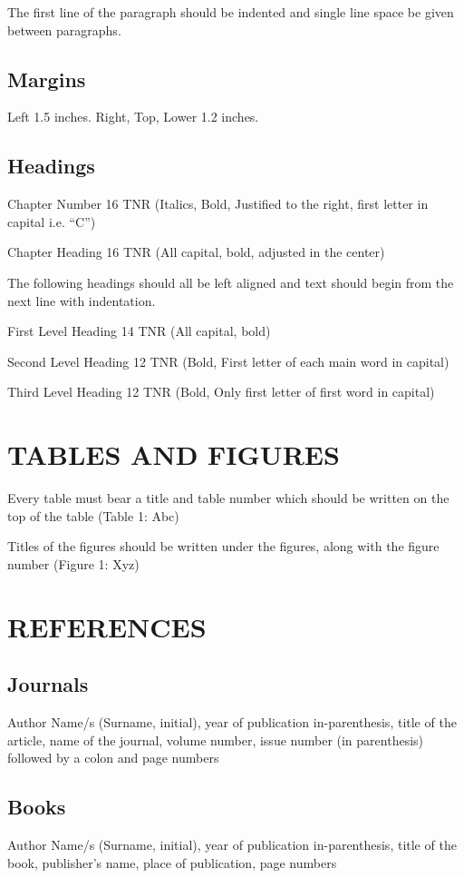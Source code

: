 \documentclass[12pt, a4paper]{report}
\begin{document}
The first line of the paragraph should be indented and single line space be given between paragraphs. 
\subsection{Margins}
Left 1.5 inches. Right, Top, Lower 1.2 inches.
\subsection{Headings}

Chapter Number 16 TNR (Italics, Bold, Justified to the right, first letter in capital i.e. “C”)

Chapter Heading 16 TNR (All capital, bold, adjusted in the center)

The following headings should all be left aligned and text should begin from the next line with indentation.

First Level Heading 14 TNR (All capital, bold)

Second Level Heading 12 TNR (Bold, First letter of each main word in capital) 

Third Level Heading 12 TNR (Bold, Only first letter of first word in capital) 

\section{TABLES AND FIGURES}
Every table must bear a title and table number which should be written on the top of the table (Table 1: Abc)

Titles of the figures should be written under the figures, along with the figure
number (Figure 1: Xyz) 

\section{REFERENCES}
\subsection{Journals}
Author Name/s (Surname, initial), year of publication in-parenthesis, title of the article, name of the journal, volume number, issue number (in parenthesis) followed by a colon and page numbers 
\subsection{Books}
Author Name/s (Surname, initial), year of publication in-parenthesis, title of the book, publisher’s name, place of publication, page numbers
\end{document}
